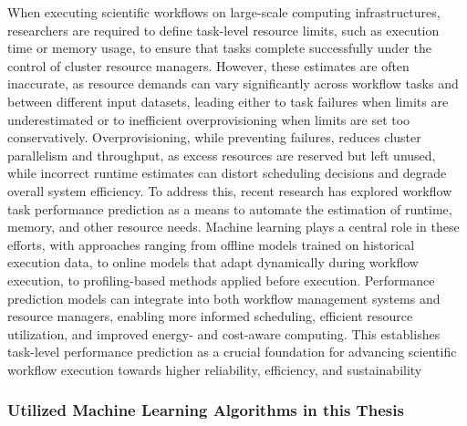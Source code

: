 When executing scientific workflows on large-scale computing infrastructures, researchers are required to define task-level resource limits, such as execution time or memory usage, to ensure that tasks complete successfully under the control of cluster resource managers. However, these estimates are often inaccurate, as resource demands can vary significantly across workflow tasks and between different input datasets, leading either to task failures when limits are underestimated or to inefficient overprovisioning when limits are set too conservatively. Overprovisioning, while preventing failures, reduces cluster parallelism and throughput, as excess resources are reserved but left unused, while incorrect runtime estimates can distort scheduling decisions and degrade overall system efficiency. To address this, recent research has explored workflow task performance prediction as a means to automate the estimation of runtime, memory, and other resource needs. Machine learning plays a central role in these efforts, with approaches ranging from offline models trained on historical execution data, to online models that adapt dynamically during workflow execution, to profiling-based methods applied before execution. Performance prediction models can integrate into both workflow management systems and resource managers, enabling more informed scheduling, efficient resource utilization, and improved energy- and cost-aware computing. This establishes task-level performance prediction as a crucial foundation for advancing scientific workflow execution towards higher reliability, efficiency, and sustainability %
\subsubsection{Utilized Machine Learning Algorithms in this Thesis}
\label{sec:background_ml_algorithms}

